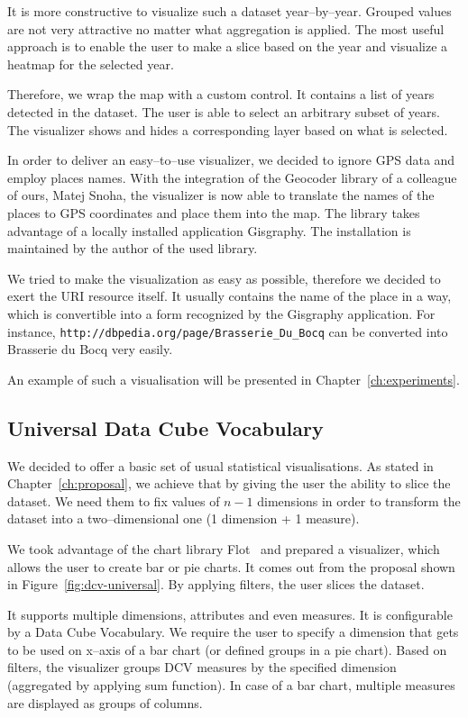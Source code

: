 It is more constructive to visualize such a dataset year--by--year. Grouped values are 
not very attractive no matter what aggregation is applied. The most useful 
approach is to enable the user to make a slice based on the year and visualize a 
heatmap for the selected year.

Therefore, we wrap the map with a custom control. It contains a list of years 
detected in the dataset. The user is able to select an arbitrary subset of 
years. The visualizer shows and hides a corresponding layer based on what is 
selected. 

In order to deliver an easy--to--use visualizer, we decided to ignore GPS 
data and employ places names. With the integration of the Geocoder library of a 
colleague of ours, Matej Snoha, the visualizer is now able to translate the names of 
the places to GPS coordinates and place them into the map. The library takes 
advantage of a locally installed application Gisgraphy. The installation is 
maintained by the author of the used library.

We tried to make the visualization as easy as possible, therefore we decided to exert the
URI resource itself. It usually contains the name of the place 
in a way, which is convertible into a form recognized by the Gisgraphy 
application. For instance, \texttt{http://dbpedia.org/page/Brasserie\_Du\_Bocq} 
can be converted into Brasserie du Bocq very easily.

An example of such a visualisation will be presented in 
Chapter~\ref{ch:experiments}.

\subsection{Universal Data Cube Vocabulary}
We decided to offer a basic set of usual statistical visualisations. As stated 
in Chapter~\ref{ch:proposal}, we achieve that by giving the user the ability to 
slice the dataset. We need them to fix values of $n-1$ dimensions in order to 
transform the dataset into a two--dimensional one (1 dimension + 1 measure).

We took advantage of the chart library Flot~\cite{flot} and prepared a 
visualizer, which allows the user to create bar or pie charts. It 
comes out from the proposal shown in Figure~\ref{fig:dcv-universal}. By 
applying filters, the user slices the dataset.

It supports multiple dimensions, attributes and even measures. It is 
configurable by a Data Cube Vocabulary. We require the user to specify a 
dimension that gets to be used on x--axis of a bar chart (or defined groups in a 
pie chart). Based on filters, the visualizer groups DCV measures by the specified 
dimension (aggregated by applying sum function). In case of a bar chart, multiple measures are 
displayed as groups of columns.

